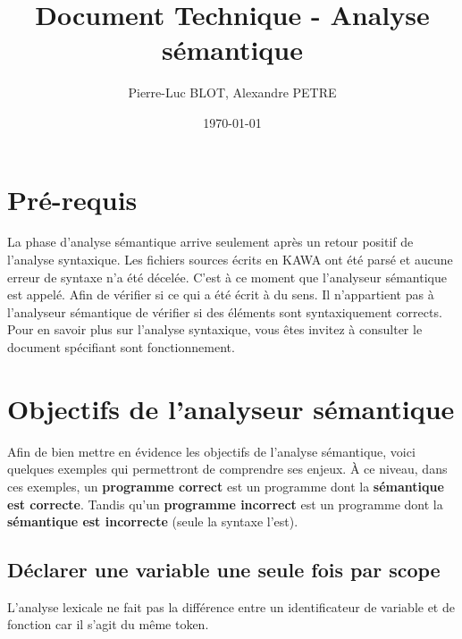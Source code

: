 \documentclass{../../res/univ-projet}
\title{Document Technique - Analyse sémantique}
\author{Pierre-Luc BLOT, Alexandre PETRE}
\date{\today}
\begin{document}
\maketitle
\newpage
\tableofcontents
\newpage

\section{Pré-requis}
  La phase d'analyse sémantique arrive seulement après un retour positif de l'analyse syntaxique. Les fichiers sources écrits en KAWA ont été parsé et aucune erreur de syntaxe n'a été décelée. C'est à ce moment que l'analyseur sémantique est appelé. Afin de vérifier si ce qui a été écrit à du sens. Il n'appartient pas à l'analyseur sémantique de vérifier si des éléments sont syntaxiquement corrects. Pour en savoir plus sur l'analyse syntaxique, vous êtes invitez à consulter le document spécifiant sont fonctionnement.

\section{Objectifs de l'analyseur sémantique}
  Afin de bien mettre en évidence les objectifs de l'analyse sémantique, voici quelques exemples qui permettront de comprendre ses enjeux. À ce niveau, dans ces exemples, un {\bfseries \color{success} programme correct} est un programme dont la {\bfseries \color{success} sémantique est correcte}. Tandis qu'un {\bfseries \color{danger} programme incorrect} est un programme dont la {\bfseries \color{danger} sémantique est incorrecte} (seule la syntaxe l'est).

  
    \subsection{Déclarer une variable une seule fois par scope}
      L'analyse lexicale ne fait pas la différence entre un identificateur de variable et de fonction car il s'agit du même token.\\
\end{document}
